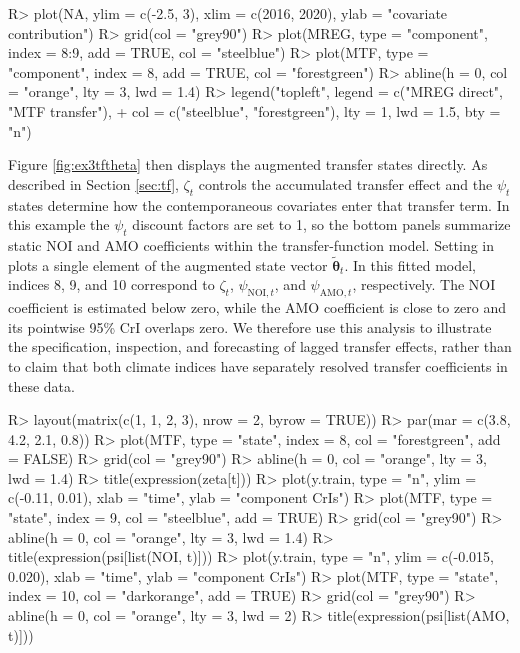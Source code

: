 \documentclass{jss}
\newcommand{\vect}[1]{\boldsymbol{#1}}
\begin{document}
\begin{CodeChunk}
\begin{CodeInput}
R> plot(NA, ylim = c(-2.5, 3), xlim = c(2016, 2020), ylab = "covariate contribution")
R> grid(col = "grey90")
R> plot(MREG, type = "component", index = 8:9, add = TRUE, col = "steelblue")
R> plot(MTF, type = "component", index = 8, add = TRUE, col = "forestgreen")
R> abline(h = 0, col = "orange", lty = 3, lwd = 1.4)
R> legend("topleft", legend = c("MREG direct", "MTF transfer"),
+        col = c("steelblue", "forestgreen"), lty = 1, lwd = 1.5, bty = "n")
\end{CodeInput}
\end{CodeChunk}

Figure \ref{fig:ex3tftheta} then displays the augmented transfer states
directly. As described in Section \ref{sec:tf}, \(\zeta_t\) controls the
accumulated transfer effect and the \(\psi_t\) states determine how the
contemporaneous covariates enter that transfer term. In this example the
\(\psi_t\) discount factors are set to 1, so the bottom panels summarize static
NOI and AMO coefficients within the transfer-function model. Setting
 in  plots a single element of the
augmented state vector \(\tilde{\vect{\theta}}_t\). In this fitted model,
indices 8, 9, and 10 correspond to \(\zeta_t\), \(\psi_{\mathrm{NOI},t}\), and
\(\psi_{\mathrm{AMO},t}\), respectively. The NOI coefficient is estimated below
zero, while the AMO coefficient is close to zero and its pointwise 95\% CrI
overlaps zero. We therefore use this analysis to illustrate the specification,
inspection, and forecasting of lagged transfer effects, rather than to claim that
both climate indices have separately resolved transfer coefficients in these
data.

\begin{CodeChunk}
\begin{CodeInput}
R> layout(matrix(c(1, 1, 2, 3), nrow = 2, byrow = TRUE))
R> par(mar = c(3.8, 4.2, 2.1, 0.8))
R> plot(MTF, type = "state", index = 8, col = "forestgreen", add = FALSE)
R> grid(col = "grey90")
R> abline(h = 0, col = "orange", lty = 3, lwd = 1.4)
R> title(expression(zeta[t]))
R> plot(y.train, type = "n", ylim = c(-0.11, 0.01), xlab = "time", ylab = "component CrIs")
R> plot(MTF, type = "state", index = 9, col = "steelblue", add = TRUE)
R> grid(col = "grey90")
R> abline(h = 0, col = "orange", lty = 3, lwd = 1.4)
R> title(expression(psi[list(NOI, t)]))
R> plot(y.train, type = "n", ylim = c(-0.015, 0.020), xlab = "time", ylab = "component CrIs")
R> plot(MTF, type = "state", index = 10, col = "darkorange", add = TRUE)
R> grid(col = "grey90")
R> abline(h = 0, col = "orange", lty = 3, lwd = 2)
R> title(expression(psi[list(AMO, t)]))
\end{CodeInput}
\end{CodeChunk}
\end{document}
